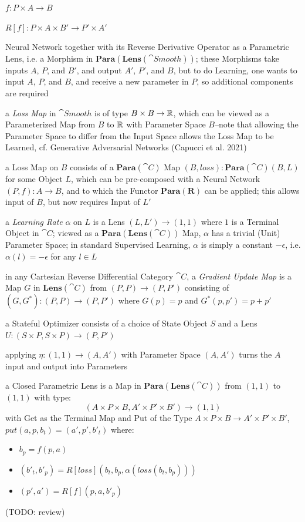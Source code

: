 $f : P \times A \to B$

$R[f] : P \times A \times B' \to P' \times A'$

Neural Network together with its Reverse Derivative Operator as a Parametric
Lens, i.e. a Morphism in $\mathbf{Para}(\mathbf{Lens}(\cat{Smooth}))$; these
Morphisms take inputs $A$, $P$, and $B'$, and output $A'$, $P'$, and $B$, but to
do Learning, one wants to input $A$, $P$, and $B$, and receive a new parameter
in $P$, so additional components are required

a \emph{Loss Map} in $\cat{Smooth}$ is of type $B \times B \to \mathbb{R}$, which
can be viewed as a Parameterized Map from $B$ to $\mathbb{R}$ with Parameter Space
$B$--note that allowing the Parameter Space to differ from the Input Space
allows the Loss Map to be Learned, cf. Generative Adversarial Networks (Capucci
et al. 2021)

a Loss Map on $B$ consists of a $\mathbf{Para}(\cat{C})$ Map
$(B,loss) : \mathbf{Para}(\cat{C})(B,L)$ for some Object $L$, which can be
pre-composed with a Neural Network $(P,f) : A \to B$, and to which the Functor
$\mathbf{Para}(\mathbf{R})$ can be applied; this allows input of $B$, but now
requires Input of $L'$

a \emph{Learning Rate} $\alpha$ on $L$ is a Lens $(L,L') \to (1,1)$ where $1$ is
a Terminal Object in $\cat{C}$; viewed as a
$\mathbf{Para}(\mathbf{Lens}(\cat{C}))$ Map, $\alpha$ has a trivial (Unit)
Parameter Space; in standard Supervised Learning, $\alpha$ is simply a constant
$-\epsilon$, i.e. $\alpha(l) = -\epsilon$ for any $l \in L$

in any Cartesian Reverse Differential Category $\cat{C}$, a
\emph{Gradient Update Map} is a Map $G$ in $\mathbf{Lens}(\cat{C})$ from
$(P,P) \to (P,P')$ consisting of $(G,G^*) : (P,P) \to (P,P')$ where
$G(p) = p$ and $G^*(p,p') = p + p'$

a Stateful Optimizer consists of a choice of State Object $S$ and a Lens
$U : (S \times P, S \times P) \to (P,P')$

applying $\eta : (1,1) \to (A,A')$ with Parameter Space $(A,A')$ turns the $A$
input and output into Parameters

a Closed Parametric Lens is a Map in $\mathbf{Para}(\mathbf{Lens}(\cat{C}))$
from $(1,1)$ to $(1,1)$ with type:
\[
  (A \times P \times B, A' \times P' \times B') \to (1,1)
\]
with Get as the Terminal Map and Put of the Type
$A \times P \times B \to A' \times P' \times B'$,
$put(a,p,b_t) = (a',p',b'_t)$ where:
\begin{itemize}
  \item $b_p = f(p,a)$
  \item $(b'_t, b'_p) = R[loss](b_t,b_p,\alpha(loss(b_t,b_p)))$
  \item $(p',a') = R[f](p,a,b'_p)$
\end{itemize}
(TODO: review)

